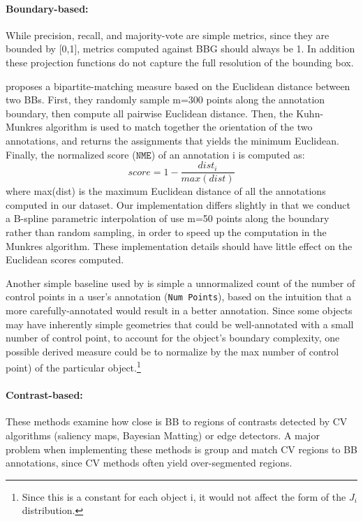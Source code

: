 \documentclass[12pt]{article}
\begin{document}
\paragraph{Boundary-based:} \par While precision, recall, and majority-vote are simple metrics, since they are bounded by [0,1], metrics computed against BBG should always be 1. In addition these projection functions do not capture the full resolution of the bounding box.  
\par \cite{Vittayakorn2011} proposes a bipartite-matching measure based on the Euclidean distance between two BBs. First, they randomly sample m=300 points along the annotation boundary, then compute all pairwise Euclidean distance. Then, the Kuhn-Munkres algorithm is used to match together the orientation of the two annotations, and returns the assignments that yields the minimum Euclidean. Finally, the normalized score ($\texttt{NME}$) of an annotation i is computed as:
\begin{equation}
score = 1-\frac{dist_i}{max(dist)}
\end{equation} where max(dist) is the maximum Euclidean distance of all the annotations computed in our dataset. Our implementation differs slightly in that we conduct a B-spline parametric interpolation of use m=50 points along the boundary rather than random sampling, in order to speed up the computation in the Munkres algorithm. These implementation details should have little effect on the Euclidean scores computed.
\par  Another simple baseline used by \cite{Vittayakorn2011} is simple a unnormalized count of the number of control points in a user's annotation (\texttt{Num Points}), based on the intuition that a more carefully-annotated would result in a better annotation. Since some objects may have inherently simple geometries that could be well-annotated with a small number of control point, to account for the object's boundary complexity, one possible derived measure could be to normalize by the max number of control point) of the particular object.\footnote{Since this is a constant for each object i, it would not affect the form of the $J_i$ distribution.} 
\paragraph{Contrast-based: } These methods examine how close is BB to regions of contrasts detected by CV algorithms (saliency maps, Bayesian Matting) or edge detectors. A major problem when implementing these methods is group and match CV regions to BB annotations, since CV methods often yield over-segmented regions.
\end{document}
